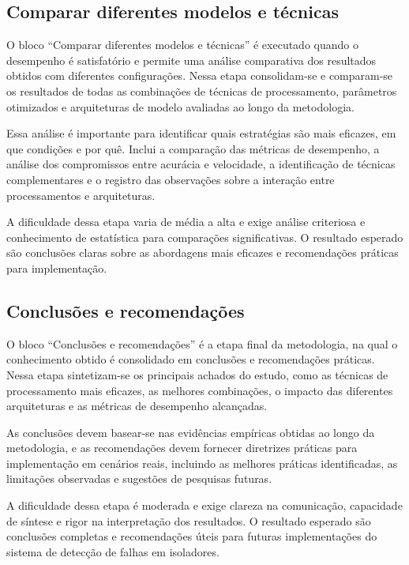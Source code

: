\subsection{Comparar diferentes modelos e técnicas}
O bloco ``Comparar diferentes modelos e técnicas'' é executado quando o desempenho é satisfatório e permite uma análise comparativa dos resultados obtidos com diferentes configurações. Nessa etapa consolidam-se e comparam-se os resultados de todas as combinações de técnicas de processamento, parâmetros otimizados e arquiteturas de modelo avaliadas ao longo da metodologia.

Essa análise é importante para identificar quais estratégias são mais eficazes, em que condições e por quê. Inclui a comparação das métricas de desempenho, a análise dos compromissos entre acurácia e velocidade, a identificação de técnicas complementares e o registro das observações sobre a interação entre processamentos e arquiteturas.

A dificuldade dessa etapa varia de média a alta e exige análise criteriosa e conhecimento de estatística para comparações significativas. O resultado esperado são conclusões claras sobre as abordagens mais eficazes e recomendações práticas para implementação.

\subsection{Conclusões e recomendações}
O bloco ``Conclusões e recomendações'' é a etapa final da metodologia, na qual o conhecimento obtido é consolidado em conclusões e recomendações práticas. Nessa etapa sintetizam-se os principais achados do estudo, como as técnicas de processamento mais eficazes, as melhores combinações, o impacto das diferentes arquiteturas e as métricas de desempenho alcançadas.

As conclusões devem basear-se nas evidências empíricas obtidas ao longo da metodologia, e as recomendações devem fornecer diretrizes práticas para implementação em cenários reais, incluindo as melhores práticas identificadas, as limitações observadas e sugestões de pesquisas futuras.

A dificuldade dessa etapa é moderada e exige clareza na comunicação, capacidade de síntese e rigor na interpretação dos resultados. O resultado esperado são conclusões completas e recomendações úteis para futuras implementações do sistema de detecção de falhas em isoladores.
